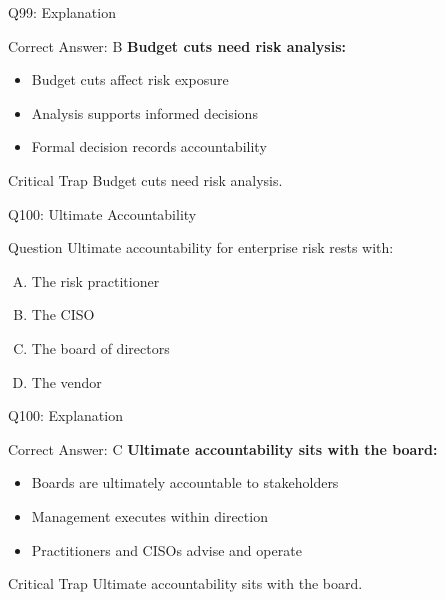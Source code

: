 \documentclass{beamer}
\begin{document}
	\begin{frame}{Q99: Explanation}
		\begin{block}{Correct Answer: B}
			\textbf{Budget cuts need risk analysis:}
			\begin{itemize}
				\item Budget cuts affect risk exposure
				\item Analysis supports informed decisions
				\item Formal decision records accountability
			\end{itemize}
		\end{block}
		\begin{alertblock}{Critical Trap}
			Budget cuts need risk analysis.
		\end{alertblock}
	\end{frame}
	
	\begin{frame}{Q100: Ultimate Accountability}
		\begin{block}{Question}
			Ultimate accountability for enterprise risk rests with:
		\end{block}
		\begin{enumerate}[(A)]
			\item The risk practitioner
			\item The CISO
			\item The board of directors
			\item The vendor
		\end{enumerate}
	\end{frame}
	
	\begin{frame}{Q100: Explanation}
		\begin{block}{Correct Answer: C}
			\textbf{Ultimate accountability sits with the board:}
			\begin{itemize}
				\item Boards are ultimately accountable to stakeholders
				\item Management executes within direction
				\item Practitioners and CISOs advise and operate
			\end{itemize}
		\end{block}
		\begin{alertblock}{Critical Trap}
			Ultimate accountability sits with the board.
		\end{alertblock}
	\end{frame}
	
\end{document}
